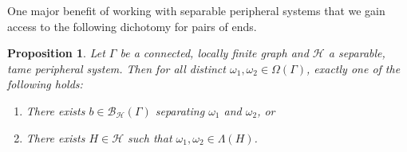\documentclass[11pt,a4paper]{amsart}
\newtheorem{proposition}[theorem]{Proposition}
\theoremstyle{definition}
\newcommand{\per}{\mathcal{H}}
\newcommand{\br}{{\mathscr{B}}}
\begin{document}
One major benefit of working with separable peripheral systems that we gain access to the following dichotomy for pairs of ends.

\begin{proposition}\label{prop:end-separating-dichotomy}
    Let $\Gamma$ be a connected, locally finite graph and $\per$ a separable, tame peripheral system. Then for all distinct  $\omega_1, \omega_2 \in \Omega(\Gamma)$, exactly one of the following holds:
    \begin{enumerate}
        \item There exists $b \in \br_\per(\Gamma)$ separating $\omega_1$ and $\omega_2$, or

        \item There exists $H \in \per$ such that $\omega_1, \omega_2 \in \Lambda(H)$.
    \end{enumerate}
\end{proposition}
\end{document}
